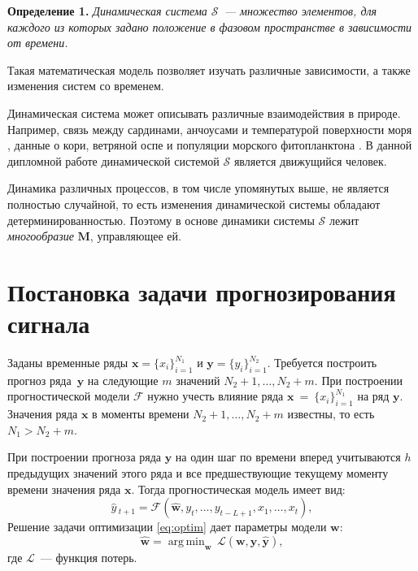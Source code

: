 \documentclass[12pt]{extarticle}
\newcommand{\bw}{\mathbf{w}}
\newcommand{\bx}{\mathbf{x}}
\newcommand{\by}{\mathbf{y}}
\newcommand{\bM}{\mathbf{M}}
\DeclareMathOperator*{\argmin}{arg\,min}
\begin{document}
\textbf{Определение 1.}
\emph{Динамическая система $\mathcal{S}$~--- множество элементов, для каждого из которых задано положение в фазовом пространстве в зависимости от времени.}

Такая математическая модель позволяет изучать различные зависимости, а также изменения систем со временем. 

Динамическая система может описывать различные взаимодействия в природе. Например, связь между сардинами, анчоусами и температурой поверхности моря \cite{sugihara2012detecting}, данные о кори, ветряной оспе и популяции морского фитопланктона \cite{sugihara1990nonlinear}. В данной дипломной работе динамической системой $\mathcal{S}$ является движущийся человек.
  
Динамика различных процессов, в том числе упомянутых выше, не является полностью случайной, то есть изменения динамической системы обладают детерминированностью. Поэтому в основе динамики системы $\mathcal{S}$ лежит \emph{многообразие}\cite{kirby1978manifold} $\bM$, управляющее ей.  
  
\section{Постановка задачи прогнозирования сигнала}
Заданы временные ряды $
 \bx=\{ x_i\}_{i=1}^{N_1}$ и $\by = \{y_i \}_{i=1}^{N_2}. 
$
  Требуется построить прогноз ряда~$\by$ на следующие $m$ значений $N_2+1, \dots, N_2+m$. 
При построении прогностической модели $\mathcal{F}$ нужно учесть влияние ряда $\bx~=~\{ x_i\}_{i=1}^{N_1}$ на ряд $\by$. Значения ряда $\bx$ в моменты времени $N_2+1, \dots, N_2+m$ известны, то есть $N_1 > N_2 + m$.

При построении прогноза ряда $\by$ на один шаг по времени вперед учитываются $h$ предыдущих значений этого ряда и все предшествующие текущему моменту времени значения ряда $\bx$. Тогда прогностическая модель имеет вид:
\begin{equation}
    \widehat{y}\,_{t+1} = \mathcal{F}(\widehat{\mathbf{w}}, y_{t}, \dots, y_{t-L+1}, x_1, \dots, x_t),
    \label{eq:F}
\end{equation}
Решение задачи оптимизации \eqref{eq:optim} дает параметры модели $\bw$:
    \begin{equation}
        \widehat{\mathbf{w}} = \argmin_{\mathbf{w}}\,\mathcal{L}(\mathbf{w}, \by, \widehat{\by}),
    \label{eq:optim}
    \end{equation}
где $\mathcal{L}$~--- функция потерь.

\setlength{\belowdisplayskip}{0pt} \setlength{\belowdisplayshortskip}{0pt}
\setlength{\abovedisplayskip}{5pt} \setlength{\abovedisplayshortskip}{5pt}
\end{document}
